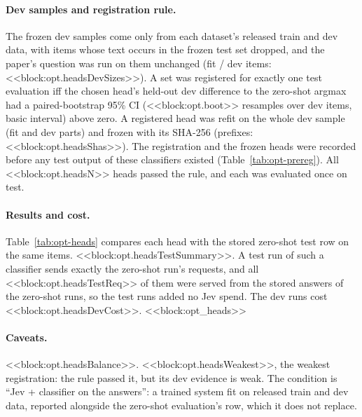 \paragraph{Dev samples and registration rule.}
The frozen dev samples come only from each dataset's released train and dev data, with items whose text occurs in the frozen test set dropped, and the paper's question was run on them unchanged (fit / dev items: <<block:opt.headsDevSizes>>). A set was registered for exactly one test evaluation iff the chosen head's held-out dev difference to the zero-shot argmax had a paired-bootstrap 95\% CI (<<block:opt.boot>> resamples over dev items, basic interval) above zero. A registered head was refit on the whole dev sample (fit and dev parts) and frozen with its SHA-256 (prefixes: <<block:opt.headsShas>>). The registration and the frozen heads were recorded before any test output of these classifiers existed (Table~\ref{tab:opt-prereg}). All <<block:opt.headsN>> heads passed the rule, and each was evaluated once on test.

\paragraph{Results and cost.}
Table~\ref{tab:opt-heads} compares each head with the stored zero-shot test row on the same items. <<block:opt.headsTestSummary>>. A test run of such a classifier sends exactly the zero-shot run's requests, and all <<block:opt.headsTestReq>> of them were served from the stored answers of the zero-shot runs, so the test runs added no Jev spend. The dev runs cost <<block:opt.headsDevCost>>.
<<block:opt_heads>>

\paragraph{Caveats.}
<<block:opt.headsBalance>>. <<block:opt.headsWeakest>>, the weakest registration: the rule passed it, but its dev evidence is weak. The condition is ``Jev + classifier on the answers'': a trained system fit on released train and dev data, reported alongside the zero-shot evaluation's row, which it does not replace.

